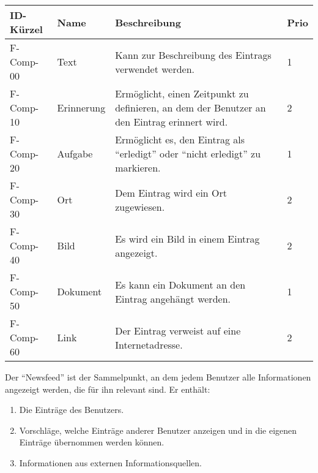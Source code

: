 \begin{tabularx}{\textwidth}{|l|l|X|l|}
    \toprule
    \textbf{ID-Kürzel} & \textbf{Name} & \textbf{Beschreibung} & \textbf{Prio}\\
    \midrule
    \endhead
    \hline
    \caption{Typen von Komponenten}
    \label{funktionen:typen}
    \endfoot
    F-Comp-00 & Text & Kann zur Beschreibung des Eintrags verwendet werden. & 1\\
    F-Comp-10 & Erinnerung & Ermöglicht, einen Zeitpunkt zu definieren, an dem der Benutzer an den Eintrag erinnert wird. & 2 \\
    F-Comp-20 & Aufgabe & Ermöglicht es, den Eintrag als \enquote{erledigt} oder \enquote{nicht erledigt} zu markieren. & 1\\
    F-Comp-30 & Ort & Dem Eintrag wird ein Ort zugewiesen. & 2 \\
    F-Comp-40 & Bild & Es wird ein Bild in einem Eintrag angezeigt. & 2 \\
    F-Comp-50 & Dokument & Es kann ein Dokument an den Eintrag angehängt werden. & 1\\
    F-Comp-60 & Link & Der Eintrag verweist auf eine Internetadresse. & 2\\
\end{tabularx}


%

Der \enquote{Newsfeed} ist der Sammelpunkt, an dem jedem Benutzer alle Informationen angezeigt werden, die für ihn relevant sind. Er enthält:

\begin{enumerate}
    \item Die Einträge des Benutzers.
    \item Vorschläge, welche Einträge anderer Benutzer anzeigen und in die eigenen Einträge übernommen werden können.
    \item Informationen aus externen Informationsquellen.
\end{enumerate}

